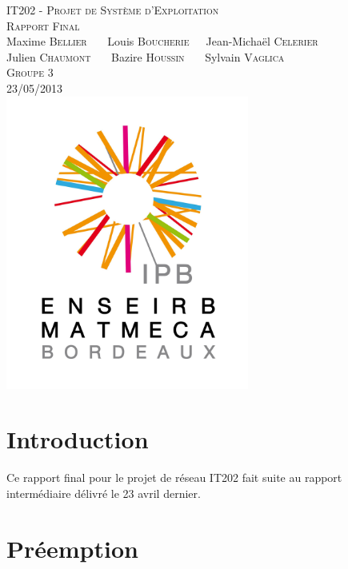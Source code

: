 \documentclass[a4paper,11pt]{article}
\begin{document}
\begin{titlepage}
  \begin{center}

    \textsc{IT202 - Projet de Système d'Exploitation}\\[2cm]
    \textsc{\large Rapport Final}\\[3cm]
    Maxime \textsc{Bellier} \ \ \ Louis \textsc{Boucherie}\ \ \ Jean-Michaël \textsc{Celerier}\\
    Julien \textsc{Chaumont} \ \ \ Bazire \textsc{Houssin} \ \ \ Sylvain \textsc{Vaglica}\\[1cm]
    \textsc{Groupe 3}\\[1.5cm]
    \textsc{\large 23/05/2013 }\\[1.5cm] %
    \includegraphics[width=8cm]{logo.png}

  \end{center}
  \vspace{3cm}

\end{titlepage}

\clearpage

\section*{Introduction}

Ce rapport final pour le projet de réseau IT202 fait suite au rapport intermédiaire délivré le 23 avril dernier.

\section{Préemption}
\end{document}
